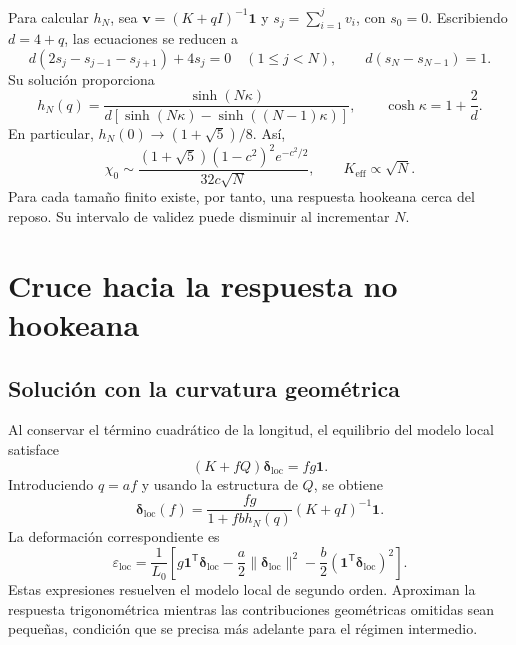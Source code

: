 \documentclass[11pt,a4paper]{article}
\begin{document}
Para calcular $h_N$, sea $\mathbf v=(K+qI)^{-1}\mathbf1$ y
$s_j=\sum_{i=1}^{j}v_i$, con $s_0=0$. Escribiendo $d=4+q$,
las ecuaciones se reducen a
\begin{equation}
d(2s_j-s_{j-1}-s_{j+1})+4s_j=0\quad(1\leq j<N),
\qquad d(s_N-s_{N-1})=1.
\end{equation}
Su solución proporciona
\begin{equation}
\boxed{
h_N(q)=\frac{\sinh(N\kappa)}
{d[\sinh(N\kappa)-\sinh((N-1)\kappa)]},
\qquad \cosh\kappa=1+\frac{2}{d}.
}
\label{eq:resolvent_exact}
\end{equation}
En particular, $h_N(0)\to(1+\sqrt5)/8$. Así,
\begin{equation}
\chi_0\sim
\frac{(1+\sqrt5)(1-c^2)^2e^{-c^2/2}}{32c\sqrt N},
\qquad K_{\mathrm{eff}}\propto\sqrt N.
\label{eq:hookean_scaling}
\end{equation}
Para cada tamaño finito existe, por tanto, una respuesta hookeana
cerca del reposo. Su intervalo de validez puede disminuir al
incrementar $N$.

\section{Cruce hacia la respuesta no hookeana}
\label{sec:crossover}

\subsection{Solución con la curvatura geométrica}

Al conservar el término cuadrático de la longitud, el equilibrio
del modelo local satisface
\begin{equation}
(K+fQ)\boldsymbol\delta_{\mathrm{loc}}=fg\mathbf1.
\label{eq:local_equilibrium}
\end{equation}
Introduciendo $q=af$ y usando la estructura de $Q$, se obtiene
\begin{equation}
\boxed{
\boldsymbol\delta_{\mathrm{loc}}(f)=
\frac{fg}{1+fbh_N(q)}(K+qI)^{-1}\mathbf1.
}
\label{eq:local_solution}
\end{equation}
La deformación correspondiente es
\begin{equation}
\varepsilon_{\mathrm{loc}}=\frac{1}{L_0}\left[
g\mathbf1^{\mathsf T}\boldsymbol\delta_{\mathrm{loc}}
-\frac a2\|\boldsymbol\delta_{\mathrm{loc}}\|^2
-\frac b2(\mathbf1^{\mathsf T}\boldsymbol\delta_{\mathrm{loc}})^2\right].
\label{eq:local_strain}
\end{equation}
Estas expresiones resuelven el modelo local de segundo orden.
Aproximan la respuesta trigonométrica mientras las contribuciones
geométricas omitidas sean pequeñas, condición que se precisa más
adelante para el régimen intermedio.
\end{document}
